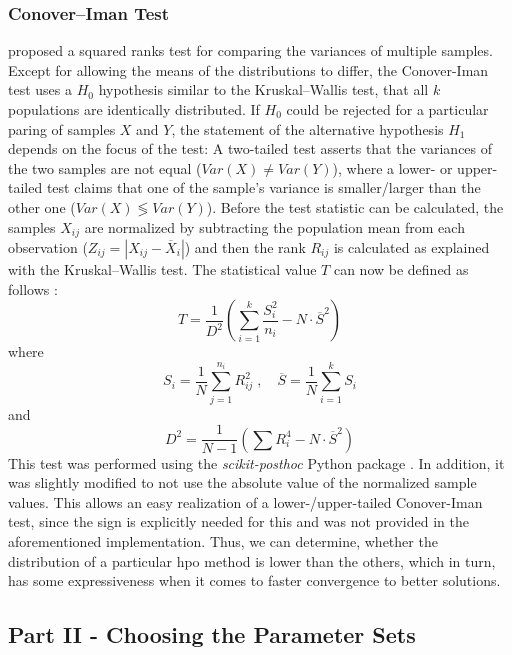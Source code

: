 \subsubsection{Conover–Iman Test}
\label{chap:conover}
\citet{conover1979multiple} proposed a squared ranks test for comparing the variances of multiple samples. Except for allowing the means of the distributions to differ, the Conover-Iman test uses a $H_0$ hypothesis similar to the Kruskal–Wallis test, that all $k$ populations are identically distributed. If $H_0$ could be rejected for a particular paring of samples $X$ and $Y$, the statement of the alternative hypothesis $H_1$ depends on the focus of the test: A two-tailed test asserts that the variances of the two samples are not equal ($Var(X) \neq Var(Y)$), where a lower- or upper-tailed test claims that one of the sample's variance is smaller/larger than the other one ($Var(X) \lessgtr Var(Y)$).
Before the test statistic can be calculated, the samples $X_{ij}$ are normalized by subtracting the population mean from each observation ($Z_{ij} = |X_{ij} - \overline{X}_i|$) and then the rank $R_{ij}$ is calculated as explained with the Kruskal–Wallis test. The statistical value $T$ can now be defined as follows \cite[Chapter~5.3]{conover1999practical}:
\begin{equation}
	T = \frac{1}{D^2} \left(  \sum_{i = 1}^{k} \frac{S_i^2}{n_i} - N\cdot \overline{S}^2 \right) 
\end{equation}
where
$$
	S_i = \frac{1}{N} \sum_{j=1}^{n_i} R^2_{ij} \; , \quad \overline{S} = \frac{1}{N} \sum_{i=1}^{k} S_i
$$
and
$$
	D^2 = \frac{1}{N-1} \left(  \sum R^4_i - N\cdot \overline{S}^2  \right)
$$
This test was performed using the \textit{scikit-posthoc} Python package \cite{Terpilowski2019}. In addition, it was slightly modified to not use the absolute value of the normalized sample values. This allows an easy realization of a lower-/upper-tailed Conover-Iman test, since the sign is explicitly needed for this and was not provided in the aforementioned implementation. Thus, we can determine, whether the distribution of a particular \gls{hpo} method is lower than the others, which in turn, has some expressiveness when it comes to faster convergence to better solutions.

\subsection{Part II - Choosing the Parameter Sets}
\label{chap:an-part2}

